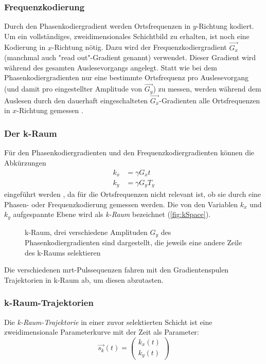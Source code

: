 \subsubsection{Frequenzkodierung}
Durch den Phasenkodiergradient werden Ortsfrequenzen in $y$-Richtung kodiert. Um ein vollständiges, zweidimensionales Schichtbild zu erhalten, ist noch eine Kodierung in $x$-Richtung nötig. Dazu wird der Frequenzkodiergradient $\vec{G_x}$ (manchmal auch "read out"-Gradient genannt) verwendet. Dieser Gradient wird während des gesamten Auslesevorgangs angelegt. Statt wie bei dem Phasenkodiergradienten nur eine bestimmte Ortsfrequenz pro Auslesevorgang (und damit pro eingestellter Amplitude von $\vec{G_y}$) zu messen, werden während dem Auslesen durch den dauerhaft eingeschalteten $\vec{G_x}$-Gradienten alle Ortsfrequenzen in $x$-Richtung gemessen \cite{Bushong2014}.

\subsubsection{Der k-Raum}
Für den Phasenkodiergradienten und den Frequenzkodiergradienten können die Abkürzungen
\begin{subequations}
	\label{eq:kSpaceEq}
	\begin{align}
	k_x & = \gamma G_x t \\
	k_y & = \gamma G_y T_y 
	\end{align}
\end{subequations}
eingeführt werden \cite[S.~333]{Doessel2016}, da für die Ortsfrequenzen nicht relevant ist, ob sie durch eine Phasen- oder Frequenzkodierung gemessen werden. Die von den Variablen $k_x$ und $k_y$ aufgespannte Ebene wird als \textit{k-Raum} bezeichnet (\autoref{fig:kSpace}).

\begin{figure}[H]
	\centering
	\caption[k-Raum]{k-Raum, drei verschiedene Amplituden $G_y$ des Phasenkodiergradienten sind dargestellt, die jeweils eine andere Zeile des k-Raums selektieren}
	\label{fig:kSpace}
\end{figure} 

Die verschiedenen \gls{mrt}-Pulssequenzen fahren mit den Gradientenspulen Trajektorien in k-Raum ab, um diesen abzutasten.

\subsubsection{k-Raum-Trajektorien}
\label{sec:ktraj}
Die \textit{k-Raum-Trajektorie} in einer zuvor selektierten Schicht ist eine zweidimensionale Parameterkurve mit der Zeit als Parameter:
\begin{equation}
\vec{s_k}(t)=\begin{pmatrix}k_x(t) \\ k_y(t)\end{pmatrix}
\end{equation}

